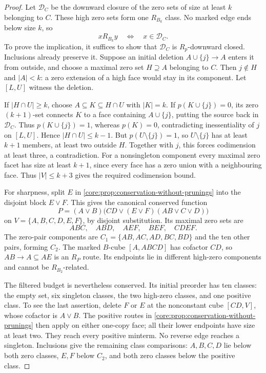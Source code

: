 \begin{proof}
Let $\mathcal D_C$ be the downward closure of the zero sets of size
at least $k$ belonging to $C$. These high zero sets form one $R_{B_k}$
class. No marked edge ends below size $k$, so
\[
 xR_{B_k}y\quad\Longleftrightarrow\quad x\in\mathcal D_C.
\]
To prove the implication, it suffices to show that $\mathcal D_C$ is
$R_p$-downward closed. Inclusions already preserve it. Suppose an initial
deletion $A\cup\{j\}\to A$ enters it from outside, and choose a
maximal zero set $H\supseteq A$ belonging to $C$. Then $j\notin H$
and $|A|<k$: a zero extension of a high face would stay in its component.
Let $[L,U]$ witness the deletion.

If $|H\cap U|\geq k$, choose
$A\subseteq K\subseteq H\cap U$ with $|K|=k$. If
$p(K\cup\{j\})=0$, its zero $(k+1)$-set connects $K$ to a face
containing $A\cup\{j\}$, putting the source back in $\mathcal D_C$.
Thus $p(K\cup\{j\})=1$, whereas $p(K)=0$, contradicting
inessentiality of $j$ on $[L,U]$. Hence $|H\cap U|\leq k-1$.
But $p(U\setminus\{j\})=1$, so $U\setminus\{j\}$ has at least
$k+1$ members, at least two outside $H$. Together with $j$, this
forces codimension at least three, a contradiction.
For a nonsingleton component every maximal zero facet has size at
least $k+1$, since every face has a zero union with a neighbouring face.
Thus $|V|\leq k+3$ gives the required codimension bound.

For sharpness, split $E$ in \cref{core:prop:conservation-without-prunings}
into the disjoint block $E\vee F$. This gives the canonical conserved function
\[
 P=(A\vee B)\bigl(CD\vee(E\vee F)(AB\vee C\vee D)\bigr)
\]
on $V=\{A,B,C,D,E,F\}$, by disjoint substitution. Its maximal zero
sets are
\[
 ABC,\quad ABD,\quad AEF,\quad BEF,\quad CDEF.
\]
The zero-pair components are
$C_1=\{AB,AC,AD,BC,BD\}$ and the ten other pairs, forming $C_2$.
The marked $B$-cube $[A,ABCD]$ has cofactor $CD$, so
$AB\to A\subseteq AE$ is an $R_P$ route. Its endpoints lie in
different high-zero components and cannot be $R_{B_2}$-related.

The filtered budget is nevertheless conserved. Its initial preorder has
ten classes: the empty set, six singleton classes, the two high-zero
classes, and one positive class. To see the last assertion, delete $F$
or $E$ at the nonconstant cube $[CD,V]$, whose cofactor is $A\vee B$.
The positive routes in \cref{core:prop:conservation-without-prunings}
then apply on either one-copy face; all their lower endpoints have size
at least two. They reach every positive minterm.
No reverse edge reaches a singleton. Inclusions give the remaining
class comparisons: $A,B,C,D$ lie below both zero classes, $E,F$ below
$C_2$, and both zero classes below the positive class.


\end{proof}
